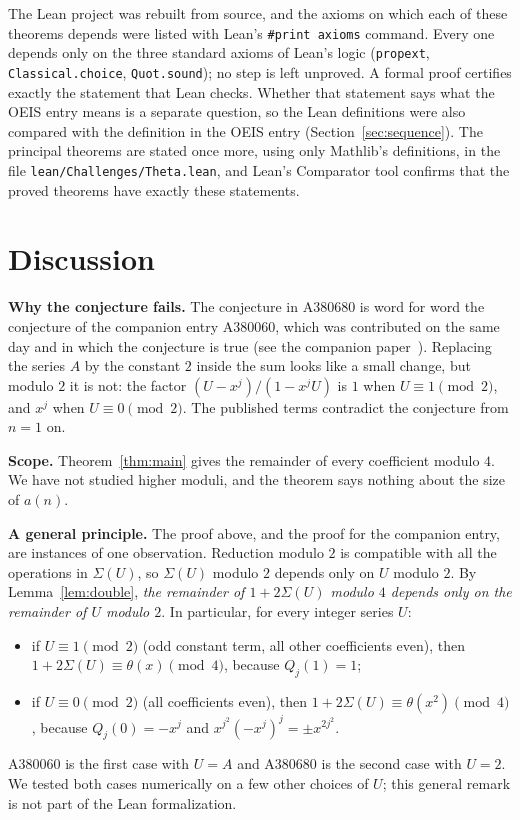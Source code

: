 \documentclass[11pt,a4paper]{article}
\theoremstyle{definition}
\theoremstyle{remark}
\newcommand{\para}[1]{\par\medskip\noindent\textbf{#1}\enspace}
\begin{document}
The Lean project was rebuilt from source, and the axioms on which each of these theorems depends were listed with
Lean's \texttt{\#print axioms} command. Every one depends only on the three standard axioms of Lean's logic
(\texttt{propext}, \texttt{Classical.choice}, \texttt{Quot.sound}); no step is left unproved. A formal proof certifies
exactly the statement that Lean checks. Whether that statement says what the OEIS entry means is a separate question,
so the Lean definitions were also compared with the definition in the OEIS entry
(Section~\ref{sec:sequence}). The principal theorems are stated once more, using only Mathlib's definitions, in the
file \texttt{lean/Challenges/Theta.lean}, and Lean's Comparator tool confirms that the
proved theorems have exactly these statements.

\section{Discussion}\label{sec:discussion}

\para{Why the conjecture fails.} The conjecture in A380680 is word for word the conjecture of the companion entry
A380060, which was contributed on the same day and in which the conjecture is true (see the companion
paper~\cite{repo}). Replacing the series $A$ by the constant $2$ inside the sum looks like a small change, but
modulo $2$ it is not: the factor $(U-x^j)/(1-x^jU)$ is $1$ when $U\equiv1\pmod2$, and $x^j$ when $U\equiv0\pmod2$.
The published terms contradict the conjecture from $n=1$ on.

\para{Scope.} Theorem~\ref{thm:main} gives the remainder of every coefficient modulo $4$. We have not studied higher
moduli, and the theorem says nothing about the size of $a(n)$.

\para{A general principle.} The proof above, and the proof for the companion entry, are instances of one
observation. Reduction modulo $2$ is compatible with
all the operations in $\Sigma(U)$, so $\Sigma(U)$ modulo $2$ depends only on $U$ modulo $2$. By
Lemma~\ref{lem:double}, \emph{the remainder of $1+2\Sigma(U)$ modulo $4$ depends only on the remainder of $U$ modulo
$2$}. In particular, for every integer series $U$:
\begin{itemize}
\item if $U\equiv1\pmod2$ (odd constant term, all other coefficients even), then $1+2\Sigma(U)\equiv\theta(x)\pmod4$,
because $Q_j(1)=1$;
\item if $U\equiv0\pmod2$ (all coefficients even), then $1+2\Sigma(U)\equiv\theta(x^2)\pmod4$, because
$Q_j(0)=-x^j$ and $x^{j^2}(-x^j)^j=\pm x^{2j^2}$.
\end{itemize}
A380060 is the first case with $U=A$ and A380680 is the second case with $U=2$. We tested both cases numerically on
a few other choices of $U$; this general remark is not part of the Lean formalization.
\end{document}
